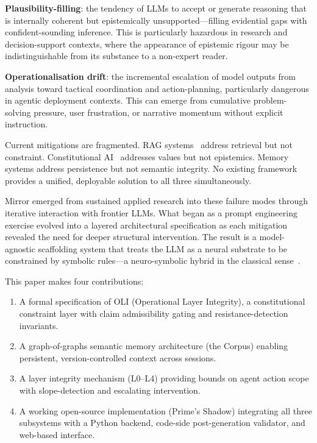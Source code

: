 \documentclass[11pt,a4paper]{article}
\begin{document}
\textbf{Plausibility-filling}: the tendency of LLMs to accept or generate reasoning that is internally coherent but epistemically unsupported---filling evidential gaps with confident-sounding inference.
This is particularly hazardous in research and decision-support contexts, where the appearance of epistemic rigour may be indistinguishable from its substance to a non-expert reader.

\textbf{Operationalisation drift}: the incremental escalation of model outputs from analysis toward tactical coordination and action-planning, particularly dangerous in agentic deployment contexts.
This can emerge from cumulative problem-solving pressure, user frustration, or narrative momentum without explicit instruction.

Current mitigations are fragmented.
RAG systems~\citep{lewis2020rag} address retrieval but not constraint.
Constitutional AI~\citep{bai2022constitutional} addresses values but not epistemics.
Memory systems address persistence but not semantic integrity.
No existing framework provides a unified, deployable solution to all three simultaneously.

Mirror emerged from sustained applied research into these failure modes through iterative interaction with frontier LLMs.
What began as a prompt engineering exercise evolved into a layered architectural specification as each mitigation revealed the need for deeper structural intervention.
The result is a model-agnostic scaffolding system that treats the LLM as a neural substrate to be constrained by symbolic rules---a neuro-symbolic hybrid in the classical sense~\citep{marcus2020next,garcez2019neurosymbolic}.

This paper makes four contributions:
\begin{enumerate}[leftmargin=2em]
    \item A formal specification of OLI (Operational Layer Integrity), a constitutional constraint layer with claim admissibility gating and resistance-detection invariants.
    \item A graph-of-graphs semantic memory architecture (the Corpus) enabling persistent, version-controlled context across sessions.
    \item A layer integrity mechanism (L0--L4) providing bounds on agent action scope with slope-detection and escalating intervention.
    \item A working open-source implementation (Prime's Shadow) integrating all three subsystems with a Python backend, code-side post-generation validator, and web-based interface.
\end{enumerate}
\end{document}

